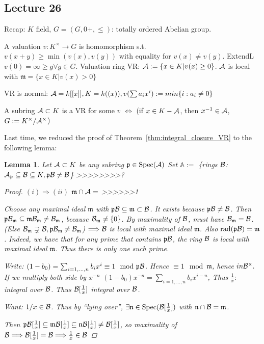 \documentclass[11pt]{article}
\newtheorem{lemma}[thm]{Lemma}
\newcommand{\scm}{{\mathfrak m}}
\newcommand{\scn}{{\mathfrak n}}
\newcommand{\scp}{{\mathfrak p}}
\newcommand{\cala}{{\cal A}}
\newcommand{\calb}{{\cal B}}
\newcommand{\Lrta}{\Longrightarrow}
\newcommand{\lrta}{\longrightarrow}
\newcommand{\Llrta}{\Longleftrightarrow}
\begin{document}
\subsection{Lecture 26}
Recap: $K$  field, $G=(G,0+,\leq)$: totally ordered Abelian group.

A valuation $v:K^\times\lrta G$ is  homomorphism s.t. $v(x+y)\geq \min (v(x),v(y))$ with equality for $v(x)\neq v(y)$. ExtendL $v(0)=\infty\geq g\forall g\in G$.
Valuation ring VR: $\cala:=\{x\in K|v(x)\geq 0\}$. $\cala$ is local with $\scm=\{x\in K|v(x)> 0\}$

VR is normal: $\cala=k[[x]], K=k((x)), v(\sum a_i x^i):=min\{i:a_i\neq 0\}$

A subring $\cala\subset K$ is a VR for some $v$
$\Llrta$ (if $x\in K-\cala$, then $x^{-1}\in\cala$, $G:=K^\times/\cala^{\times}$)


Last time, we reduced the proof of Theorem~\ref{thm:integral_closure_VR} to the following lemma:
\begin{lemma}
Let $\cala\subset K$ be any subring $\scp\in \text{Spec}(\cala)$ Set $\mathbb{A}:=$ \{rings $\calb$: $\cala_\scp\subseteq \calb\subseteq K, \scp\calb\neq \calb$\}
>>>>>>>>?
\begin{proof}
$(i)\Lrta (ii)$ $\scm\cap \cala=$
>>>>>>1

Choose any maximal ideal $\scm$ with $\scp\calb\subseteq \scm\subset \calb$. It exists because $\scp\calb\neq \calb$. Then $\scp\calb_\scm\subseteq \scm\calb_\scm\neq \calb_\scm$, because $\calb_\scm\neq \{0\}$. By maximality of $\calb$, must have $\calb_\scm=\calb$. (Else $\calb_\scm\supsetneq \calb, \scp\calb_\scm\neq \calb_\scm$) $\Lrta \calb$ is local with maximal ideal $\scm$. Also $\text{rad}(\scp\calb)=\scm$. Indeed, we have that for any prime that contains $\scp\calb$, the ring $\calb$ is local with maximal ideal $\scm$. Thus there is only one such prime.

Write: $(1-b_0)=\sum_{i=1,...,n}b_i x^i\equiv 1\mod \scp\calb$. Hence $\equiv 1\mod \scm$, hence $in \calb^\times.$ If we multiply both side by $x^{-n}$
$(1-b_0)x^{-n}=\sum_{i=1,...,n}b_i x^{i-n}$, Thus $\frac{1}{x}: $ integral over $\calb$. Thus $\calb[\frac{1}{x}]$ integral over $\calb$.

Want: $1/x\in \calb$. Thus by ``lying over'', $\exists \scn\in \text{Spec}(\calb[\frac{1}{x}])$ with $\scn\cap \calb=\scm$.

Then $\scp\calb[\frac{1}{x}]\subseteq\scm\calb[\frac{1}{x}]\subseteq \scn\calb[\frac{1}{x}]\neq \calb[\frac{1}{x}]$, so maximality of $\calb\Lrta \calb[\frac{1}{x}]=\calb\Lrta \frac{1}{x}\in \calb$
\end{proof}
\end{lemma}
\end{document}
